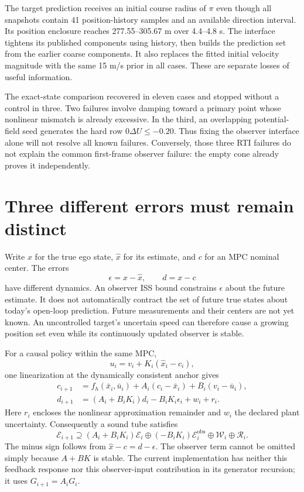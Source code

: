 \documentclass[11pt]{article}
\newcommand{\E}{\mathcal E}
\begin{document}
The target prediction receives an initial course radius of $\pi$ even
though all snapshots contain 41 position-history samples and an available
direction interval. Its position enclosure reaches 277.55--305.67 m over
4.4--4.8 s. The interface tightens its published components using history,
then builds the prediction set from the earlier coarse components.
It also replaces the fitted initial velocity magnitude with the same
15 m/s prior in all cases. These are separate losses of useful information.

The exact-state comparison recovered in eleven cases and stopped without a
control in three. Two failures involve damping toward a primary point whose
nonlinear mismatch is already excessive. In the third, an overlapping
potential-field seed generates the hard row $0\Delta U\le-0.20$.
Thus fixing the observer interface alone will not resolve all known failures.
Conversely, those three RTI failures do not explain the common first-frame
observer failure: the empty cone already proves it independently.

\section{Three different errors must remain distinct}
Write $x$ for the true ego state, $\hat x$ for its estimate, and $c$ for an
MPC nominal center. The errors
\[
 \epsilon=x-\hat x,\qquad d=x-c
\]
have different dynamics. An observer ISS bound constrains $\epsilon$ about
the future estimate. It does not automatically contract the set of future
true states about today's open-loop prediction. Future measurements and
their centers are not yet known. An uncontrolled target's uncertain speed
can therefore cause a growing position set even while its continuously
updated observer is stable.

For a causal policy within the same MPC,
\begin{equation}\label{eq:policy}
 u_i=v_i+K_i(\hat x_i-c_i),
\end{equation}
one linearization at the dynamically consistent anchor gives
\begin{align}
 c_{i+1}&=f_h(\bar x_i,\bar u_i)+A_i(c_i-\bar x_i)+B_i(v_i-\bar u_i),\\
 d_{i+1}&=(A_i+B_iK_i)d_i-B_iK_i\epsilon_i+w_i+r_i.
 \label{eq:error}
\end{align}
Here $r_i$ encloses the nonlinear approximation remainder and $w_i$ the
declared plant uncertainty. Consequently a sound tube satisfies
\begin{equation}\label{eq:tube}
 \E_{i+1}\supseteq(A_i+B_iK_i)\E_i
 \oplus(-B_iK_i)\E_i^{\mathrm{obs}}\oplus\mathcal W_i\oplus\mathcal R_i.
\end{equation}
The minus sign follows from $\hat x-c=d-\epsilon$. The observer term cannot
be omitted simply because $A+BK$ is stable. The current implementation has
neither this feedback response nor this observer-input contribution in its
generator recursion; it uses $G_{i+1}=A_iG_i$.
\end{document}
